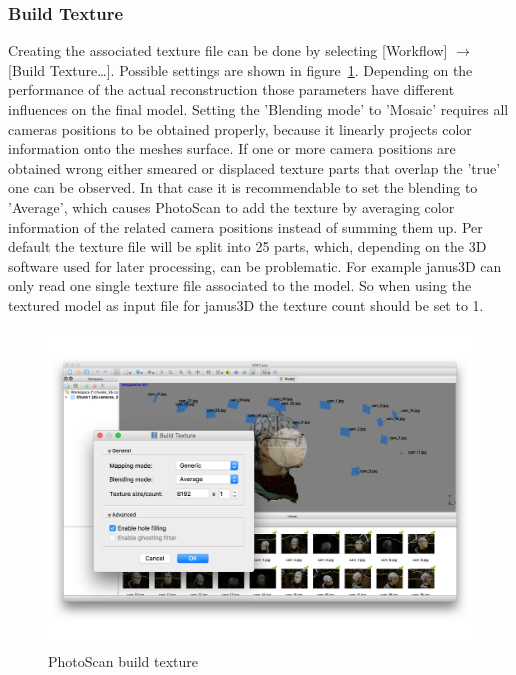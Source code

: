 \documentclass[12pt,a4paper]{scrartcl}
\begin{document}
\subsubsection{Build Texture}
Creating the associated texture file can be done by selecting [Workflow] $\rightarrow$ [Build Texture\dots]. Possible settings are shown in figure~\ref{fig:photoscantex}. Depending on the performance of the actual reconstruction those parameters have different influences on the final model. Setting the 'Blending mode' to 'Mosaic' requires all cameras positions to be obtained properly, because it linearly projects color information onto the meshes surface. If one or more camera positions are obtained wrong either smeared or displaced texture parts that overlap the 'true' one can be observed. In that case it is recommendable to set the blending to 'Average', which causes PhotoScan to add the texture by averaging color information of the related camera positions instead of summing them up. Per default the texture file will be split into 25 parts, which, depending on the 3D software used for later processing, can be problematic. For example janus3D can only read one single texture file associated to the model. So when using the textured model as input file for janus3D the texture count should be set to 1.
\begin{figure}[!h]
  \includegraphics[width=1\textwidth]{PhotoScan-texture}
  \caption{PhotoScan build texture}
  \label{fig:photoscantex}
\end{figure}
\end{document}
